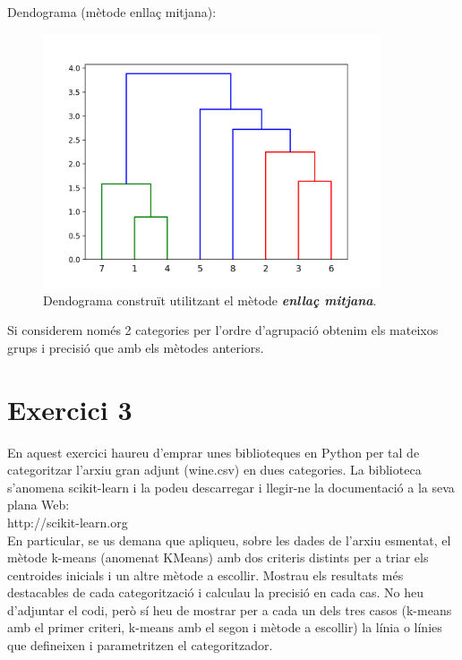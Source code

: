 \documentclass{article} %
\begin{document}
{	Dendograma (mètode enllaç mitjana):

	\begin{figure}[H]
		\includegraphics[width=10cm]{average}
		\centering
		\color{blue}
		\caption{Dendograma construït utilitzant el mètode \textbf{\textit{enllaç mitjana}}.}\label{visina8}
	\end{figure}

	Si considerem només 2 categories per l'ordre d'agrupació obtenim els mateixos grups i precisió que amb els mètodes anteriors.
}

\section{Exercici 3}
En aquest exercici haureu d'emprar unes biblioteques en Python per tal de categoritzar l'arxiu gran adjunt (wine.csv) en dues categories. La biblioteca s'anomena scikit-learn i la podeu descarregar i llegir-ne la documentació a la seva plana Web: \\

http://scikit-learn.org \\

En particular, se us demana que apliqueu, sobre les dades de l'arxiu esmentat, el mètode k-means (anomenat KMeans) amb dos criteris distints per a triar els centroides inicials i un altre mètode a escollir. Mostrau els resultats més destacables de cada categorització i calculau la precisió en cada cas. No heu d'adjuntar el codi, però sí heu de mostrar per a cada un dels tres casos (k-means amb el primer criteri, k-means amb el segon i mètode a escollir) la línia o línies que defineixen i parametritzen el categoritzador.
\\
\end{document}

